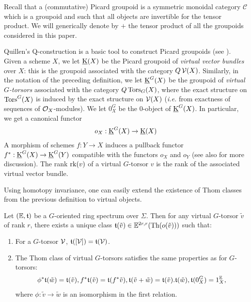\begin{num}
Recall that a (commutative) Picard groupoid is a symmetric monoidal category $\mathscr C$
which is a groupoid and such that all objects are invertible for the tensor product.
We will generically denote by $+$ the tensor product of all the groupoids considered
in this paper.

Quillen's Q-construction is a basic tool to construct Picard groupoids (see \cite{Del_det}).
Given a scheme $X$, we let $\operatorname{\underline K}(X)$ be the Picard groupoid of \emph{virtual vector bundles} over $X$:
this is the groupoid associated with the category $Q\operatorname{\mathcal V}(X)$.
Similarly, in the notation of the preceding definition, we let $\operatorname{\underline K}^G(X)$ be
the groupoid of \emph{virtual $G$-torsors} associated with the category $Q\operatorname{Tors}_G(X)$,
where the exact structure on $\operatorname{Tors}^G(X)$ is induced by the exact structure on $\operatorname{\mathcal V}(X)$
(\emph{i.e.} from exactness of sequences of $\mathcal O_X$-modules).
We let $0^G_X$ be the $0$-object of $\operatorname{\underline K}^G(X)$.
In particular, we get a canonical functor 
\begin{equation}\label{eq:forget_virtual}
o_X:\operatorname{\underline K}^G(X) \rightarrow \operatorname{\underline K}(X)
\end{equation}
A morphism of schemes $f:Y \rightarrow X$ induces a pullback functor $f^*:\operatorname{\underline K}^G(X) \rightarrow \operatorname{\underline K}^G(Y)$
compatible with the functors $o_X$ and $o_Y$ (see also  for more discussion).
The rank $\operatorname{rk}(v)$ of a virtual $G$-torsor $v$ is the rank of the associated virtual vector bundle.

Using homotopy invariance, one can easily extend the existence of Thom classes
from the previous definition to virtual objects.
\end{num}
\begin{prop}\label{prop:virt_thom_G-orient}\label{prop:thom_virtual}
Let $(\mathbb E,\mathfrak{t})$ be a $G$-oriented ring spectrum over $\Sigma$.
Then for any virtual $G$-torsor $\tilde v$ of rank $r$,
 there exists a unique class $\mathfrak{t}(\tilde v) \in \mathbb E^{2r,r}(\operatorname{Th}(o(\tilde v)))$ such that:
\begin{enumerate}
\item For a $G$-torsor $\mathcal V$, $\mathfrak{t}([\mathcal V])=\mathfrak{t}(\mathcal V)$.
\item The Thom class of virtual $G$-torsors satisfies the same properties as for $G$-torsors:
$$
\phi^*\mathfrak{t}(\tilde w)=\mathfrak{t}(\tilde v), f^*\mathfrak{t}(\tilde v)=\mathfrak{t}(f^*\tilde v), \mathfrak{t}(\tilde v+\tilde w)=\mathfrak{t}(\tilde v).\mathfrak{t}(\tilde w), \mathfrak{t}(0^G_X)=1_X^\mathbb E,
$$
where $\phi:\tilde v \rightarrow \tilde w$ is an isomorphism in the first relation.
\end{enumerate}
\end{prop}
